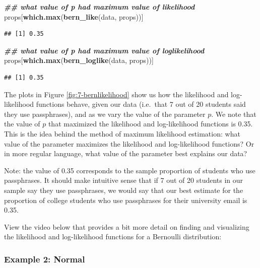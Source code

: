 \documentclass[
]{book}
\newenvironment{Shaded}{\begin{snugshade}}{\end{snugshade}}
\newcommand{\DocumentationTok}[1]{\textcolor[rgb]{0.56,0.35,0.01}{\textbf{\textit{#1}}}}
\newcommand{\FunctionTok}[1]{\textcolor[rgb]{0.13,0.29,0.53}{\textbf{#1}}}
\newcommand{\NormalTok}[1]{#1}
\begin{document}
\begin{Shaded}
\begin{Highlighting}[]
\DocumentationTok{\#\# what value of p had maximum value of likelihood}
\NormalTok{props[}\FunctionTok{which.max}\NormalTok{(}\FunctionTok{bern\_like}\NormalTok{(data, props))]}
\end{Highlighting}
\end{Shaded}

\begin{verbatim}
## [1] 0.35
\end{verbatim}

\begin{Shaded}
\begin{Highlighting}[]
\DocumentationTok{\#\# what value of p had maximum value of loglikelihood}
\NormalTok{props[}\FunctionTok{which.max}\NormalTok{(}\FunctionTok{bern\_loglike}\NormalTok{(data, props))]}
\end{Highlighting}
\end{Shaded}

\begin{verbatim}
## [1] 0.35
\end{verbatim}

The plots in Figure \ref{fig:7-bernlikelihood} show us how the likelihood and log-likelihood functions behave, given our data (i.e.~that 7 out of 20 students said they use passphrases), and as we vary the value of the parameter \(p\). We note that the value of \(p\) that maximized the likelihood and log-likelihood functions is 0.35. This is the idea behind the method of maximum likelihood estimation: what value of the parameter maximizes the likelihood and log-likelihood functions? Or in more regular language, what value of the parameter best explains our data?

Note: the value of 0.35 corresponds to the sample proportion of students who use passphrases. It should make intuitive sense that if 7 out of 20 students in our sample say they use passphrases, we would say that our best estimate for the proportion of college students who use passphrases for their university email is 0.35.

View the video below that provides a bit more detail on finding and visualizing the likelihood and log-likelihood functions for a Bernoulli distribution:

\hypertarget{example-2-normal}{%
\subsubsection{Example 2: Normal}\label{example-2-normal}}
\end{document}
